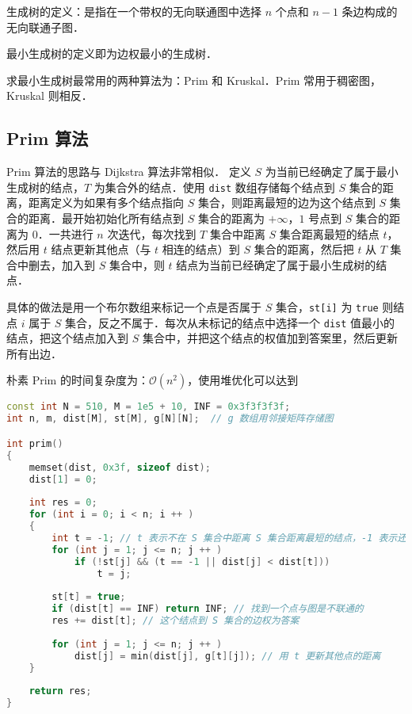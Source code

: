 
\begin{issues}
\issueMissDepend
\end{issues}

生成树的定义：是指在一个带权的无向联通图中选择 $n$ 个点和 $n - 1$ 条边构成的无向联通子图．

最小生成树的定义即为边权最小的生成树．

求最小生成树最常用的两种算法为：Prim 和 Kruskal．Prim 常用于稠密图，Kruskal 则相反．

\subsection{Prim 算法}

Prim 算法的思路与 Dijkstra 算法非常相似．
定义 $S$ 为当前已经确定了属于最小生成树的结点，$T$ 为集合外的结点．使用 \verb|dist| 数组存储每个结点到 $S$ 集合的距离，距离定义为如果有多个结点指向 $S$ 集合，则距离最短的边为这个结点到 $S$ 集合的距离．最开始初始化所有结点到 $S$ 集合的距离为 $+\infty$，$1$ 号点到 $S$ 集合的距离为 $0$．一共进行 $n$ 次迭代，每次找到 $T$ 集合中距离 $S$ 集合距离最短的结点 $t$，然后用 $t$ 结点更新其他点（与 $t$ 相连的结点）到 $S$ 集合的距离，然后把 $t$ 从 $T$ 集合中删去，加入到 $S$ 集合中，则 $t$ 结点为当前已经确定了属于最小生成树的结点．

具体的做法是用一个布尔数组来标记一个点是否属于 $S$ 集合，\verb|st[i]| 为 \verb|true| 则结点 $i$ 属于 $S$ 集合，反之不属于．每次从未标记的结点中选择一个 \verb|dist| 值最小的结点，把这个结点加入到 $S$ 集合中，并把这个结点的权值加到答案里，然后更新所有出边．

朴素 Prim 的时间复杂度为：$\mathcal{O}(n^2)$，使用堆优化可以达到

\begin{lstlisting}[language=cpp]
const int N = 510, M = 1e5 + 10, INF = 0x3f3f3f3f;
int n, m, dist[M], st[M], g[N][N];  // g 数组用邻接矩阵存储图

int prim()
{
    memset(dist, 0x3f, sizeof dist);
    dist[1] = 0;
    
    int res = 0;
    for (int i = 0; i < n; i ++ )
    {
        int t = -1; // t 表示不在 S 集合中距离 S 集合距离最短的结点，-1 表示还没找到
        for (int j = 1; j <= n; j ++ )
            if (!st[j] && (t == -1 || dist[j] < dist[t]))  
                t = j;  
        
        st[t] = true;
        if (dist[t] == INF) return INF; // 找到一个点与图是不联通的
        res += dist[t]; // 这个结点到 S 集合的边权为答案
        
        for (int j = 1; j <= n; j ++ )
            dist[j] = min(dist[j], g[t][j]); // 用 t 更新其他点的距离
    }
     
    return res;
}
\end{lstlisting}